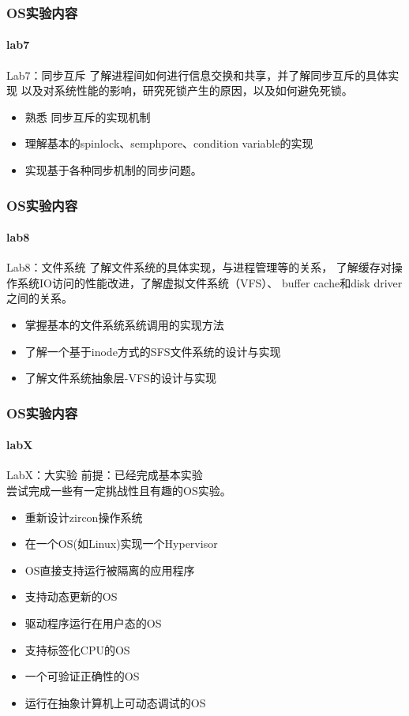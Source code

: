 \documentclass[UTF8]{ctexbeamer}
\begin{document}
\begin{frame}
\frametitle{OS实验内容}
\framesubtitle{lab7}

\begin{block}{Lab7：同步互斥}
了解进程间如何进行信息交换和共享，并了解同步互斥的具体实现
以及对系统性能的影响，研究死锁产生的原因，以及如何避免死锁。
\end{block}

\begin{itemize}
    \item 熟悉 同步互斥的实现机制
    \item 理解基本的spinlock、semphpore、condition variable的实现
    \item 实现基于各种同步机制的同步问题。
\end{itemize}

\end{frame}


\begin{frame}
\frametitle{OS实验内容}
\framesubtitle{lab8}

\begin{block}{Lab8：文件系统}
了解文件系统的具体实现，与进程管理等的关系，
了解缓存对操作系统IO访问的性能改进，了解虚拟文件系统（VFS）、
buffer cache和disk driver之间的关系。
\end{block}

\begin{itemize}
    \item 掌握基本的文件系统系统调用的实现方法
    \item 了解一个基于inode方式的SFS文件系统的设计与实现
    \item 了解文件系统抽象层-VFS的设计与实现
\end{itemize}

\end{frame}


\begin{frame}
\frametitle{OS实验内容}
\framesubtitle{labX}

\begin{block}{LabX：大实验}
前提：已经完成基本实验 \\
尝试完成一些有一定挑战性且有趣的OS实验。
\end{block}

\begin{itemize}
    \item 重新设计zircon操作系统
    \item 在一个OS(如Linux)实现一个Hypervisor
    \item OS直接支持运行被隔离的应用程序
    \item 支持动态更新的OS
    \item 驱动程序运行在用户态的OS
    \item 支持标签化CPU的OS
    \item 一个可验证正确性的OS
    \item 运行在抽象计算机上可动态调试的OS
\end{itemize}

\end{frame}

\end{document}
